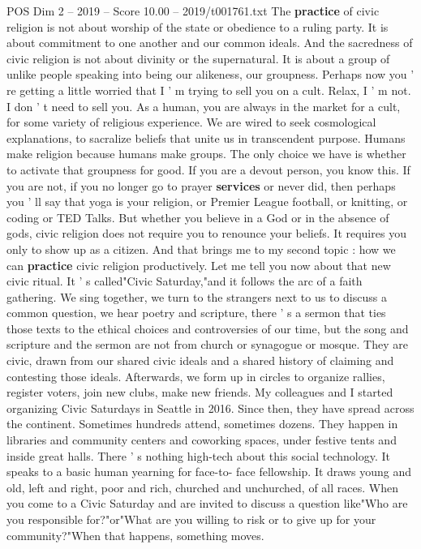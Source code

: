 \begin{textsample}{POS Dim 2 – 2019 – Score 10.00 – 2019/t001761.txt}
The \textbf{practice} of civic religion is not about worship of the state or obedience to a ruling party.
It is about commitment to one another and our common ideals.
And the sacredness of civic religion is not about divinity or the supernatural.
It is about a group of unlike people speaking into being our alikeness, our groupness.
Perhaps now you ' re getting a little worried that I ' m trying to sell you on a cult.
Relax, I ' m not.
I don ' t need to sell you.
As a human, you are always in the market for a cult, for some variety of religious experience.
We are wired to seek cosmological explanations, to sacralize beliefs that unite us in transcendent purpose.
Humans make religion because humans make groups.
The only choice we have is whether to activate that groupness for good.
If you are a devout person, you know this.
If you are not, if you no longer go to prayer \textbf{services} or never did, then perhaps you ' ll say that yoga is your religion, or Premier League football, or knitting, or coding or TED Talks.
But whether you believe in a God or in the absence of gods, civic religion does not require you to renounce your beliefs.
It requires you only to show up as a citizen.
And that brings me to my second topic : how we can \textbf{practice} civic religion productively.
Let me tell you now about that new civic ritual.
It ' s called"Civic Saturday,"and it follows the arc of a faith gathering.
We sing together, we turn to the strangers next to us to discuss a common question, we hear poetry and scripture, there ' s a sermon that ties those texts to the ethical choices and controversies of our time, but the song and scripture and the sermon are not from church or synagogue or mosque.
They are civic, drawn from our shared civic ideals and a shared history of claiming and contesting those ideals.
Afterwards, we form up in circles to organize rallies, register voters, join new clubs, make new friends.
My colleagues and I started organizing Civic Saturdays in Seattle in 2016.
Since then, they have spread across the continent.
Sometimes hundreds attend, sometimes dozens.
They happen in libraries and community centers and coworking spaces, under festive tents and inside great halls.
There ' s nothing high-tech about this social technology.
It speaks to a basic human yearning for face-to- face fellowship.
It draws young and old, left and right, poor and rich, churched and unchurched, of all races.
When you come to a Civic Saturday and are invited to discuss a question like"Who are you responsible for?"or"What are you willing to risk or to give up for your community?"When that happens, something moves.

\end{textsample}
